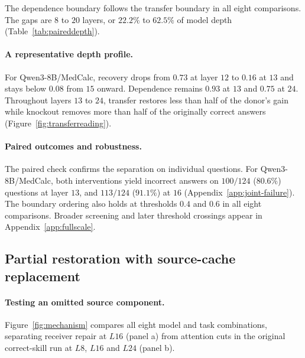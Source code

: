 The dependence boundary follows the transfer boundary in all eight
comparisons. The gaps are $8$ to $20$ layers, or $22.2\%$ to $62.5\%$ of
model depth (Table~\ref{tab:paireddepth}). 
\begin{table}[t]
\centering
\caption{Main depth comparison across four open-weight models and two benchmarks.
$n/G$ gives common eligible questions/skill groups. $T$ and $R$ are the first
half-effect crossings for transfer ($\rho<0.5$) and aggregate source dependence
($d\le0.5$). $\Delta=R-T$ is in layers. $\Delta/D$ normalizes the gap
by the model's layer count. All eight cells use audited common-item populations.}
\label{tab:paireddepth}
\normalfont\rmfamily\fontsize{9}{11}\selectfont
\renewcommand{\arraystretch}{1.18}
\setlength{\tabcolsep}{3pt}

\end{table}

\paragraph{A representative depth profile.}
For Qwen3-8B/MedCalc, recovery drops from $0.73$
at layer $12$ to $0.16$ at $13$ and stays below $0.08$ from $15$ onward.
Dependence remains $0.93$ at $13$ and $0.75$ at $24$.
Throughout layers $13$ to $24$, transfer restores less than half of the
donor's gain while knockout removes more than half of the originally
correct answers (Figure~\ref{fig:transferreading}).

\paragraph{Paired outcomes and robustness.}
The paired check confirms the separation on individual questions. For
Qwen3-8B/MedCalc, both interventions yield incorrect answers on $100/124$
($80.6\%$) questions at layer $13$, and $113/124$ ($91.1\%$) at $16$ (Appendix~\ref{app:joint-failure}). The boundary ordering also
holds at thresholds $0.4$ and $0.6$ in all eight comparisons. Broader
screening and later threshold crossings appear in Appendix~\ref{app:fullscale}.

\subsection{Partial restoration with source-cache replacement}
\label{sec:mechanism}

\paragraph{Testing an omitted source component.}
Figure~\ref{fig:mechanism} compares all eight model and task combinations,
separating receiver repair at $L16$ (panel a) from attention cuts in the
original correct-skill run at $L8$, $L16$ and $L24$ (panel b).

